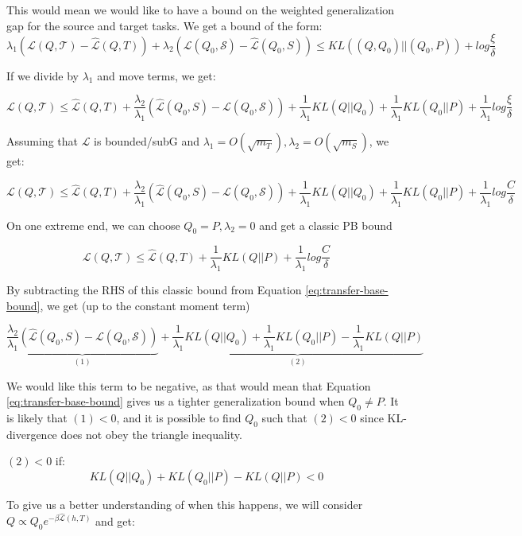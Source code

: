 \documentclass[letterpaper]{article}
\theoremstyle{definition}
\begin{document}
This would mean we would like to have a bound on the weighted generalization gap for the source and target tasks. We get a bound of the form: $$\lambda_1 \left (\mathcal{L}(Q, \mathcal{T})-\hat{\mathcal{L}}(Q,T)\right )+\lambda_2 \left (\mathcal{L}(Q_0,\mathcal{S})-\hat{\mathcal{L}}(Q_0,S) \right )\leq KL((Q, Q_0)||(Q_0,P)) + log\frac{\xi}{\delta}$$

If we divide by $\lambda_1$ and move terms, we get:

$$ \mathcal{L}(Q, \mathcal{T}) \leq \hat{\mathcal{L}}(Q,T) +\frac{\lambda_2}{\lambda_1} \left (\hat{\mathcal{L}}(Q_0,S)-\mathcal{L}(Q_0,\mathcal{S}) \right ) + \frac{1}{\lambda_1}KL(Q||Q_0)+\frac{1}{\lambda_1}KL(Q_0||P)+ \frac{1}{\lambda_1}log\frac{\xi}{\delta}$$

Assuming that $\mathcal{L}$ is bounded/subG and $\lambda_1=O(\sqrt{m_T}), \lambda_2=O(\sqrt{m_S})$, we get:

\begin{equation} \label{eq:transfer-base-bound}
\mathcal{L}(Q, \mathcal{T}) \leq \hat{\mathcal{L}}(Q,T) +\frac{\lambda_2}{\lambda_1} \left (\hat{\mathcal{L}}(Q_0,S)-\mathcal{L}(Q_0,\mathcal{S}) \right ) + \frac{1}{\lambda_1}KL(Q||Q_0)+\frac{1}{\lambda_1}KL(Q_0||P)+ \frac{1}{\lambda_1}log\frac{C}{\delta}
\end{equation}

On one extreme end, we can choose $Q_0=P, \lambda_2=0$ and get a classic PB bound

$$ \mathcal{L}(Q, \mathcal{T}) \leq \hat{\mathcal{L}}(Q,T) +\frac{1}{\lambda_1}KL(Q||P)+ \frac{1}{\lambda_1}log\frac{C}{\delta}$$

By subtracting the RHS of this classic bound from Equation \ref{eq:transfer-base-bound}, we get (up to the constant moment term)

$$\underbrace{\frac{\lambda_2}{\lambda_1} \left (\hat{\mathcal{L}}(Q_0,S)-\mathcal{L}(Q_0,\mathcal{S}) \right )}_{(1)} + \underbrace{\frac{1}{\lambda_1}KL(Q||Q_0)+\frac{1}{\lambda_1}KL(Q_0||P)-\frac{1}{\lambda_1}KL(Q||P)}_{(2)}$$

We would like this term to be negative, as that would mean that Equation \ref{eq:transfer-base-bound} gives us a tighter generalization bound when $Q_0\neq P$. It is likely that $(1)<0$, and it is possible to find $Q_0$ such that $(2)<0$ since KL-divergence does not obey the triangle inequality.

$(2)<0$ if:
$$ KL(Q||Q_0)+KL(Q_0||P)-KL(Q||P) < 0$$

To give us a better understanding of when this happens, we will consider $Q\propto Q_0 e^{-\beta \hat{\mathcal{L}}(h,T)}$ and get:
\end{document}
